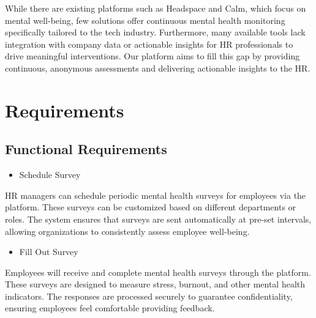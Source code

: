 \documentclass[conference]{IEEEtran}
\begin{document}
        While there are existing platforms such as Headspace and
        Calm, which focus on mental well-being, few solutions offer
        continuous mental health monitoring specifically tailored to
        the tech industry. Furthermore, many available tools lack
        integration with company data or actionable insights for HR
        professionals to drive meaningful interventions. Our platform
        aims to fill this gap by providing continuous, anonymous
        assessments and delivering actionable insights to the HR.
        \newline
    
    \section{Requirements}
        
        \subsection{Functional Requirements}
        
            \begin{itemize}
                \item Schedule Survey
            \end{itemize}
            
            HR managers can schedule periodic mental health surveys
            for employees via the platform. These surveys can be
            customized based on different departments or roles. The
            system ensures that surveys are sent automatically at pre-set
            intervals, allowing organizations to consistently assess
            employee well-being.
            \newline
            
            \begin{itemize}
                \item Fill Out Survey
            \end{itemize}
                
            Employees will receive and complete mental health
            surveys through the platform. These surveys are designed to
            measure stress, burnout, and other mental health indicators.
            The responses are processed securely to guarantee
            confidentiality, ensuring employees feel comfortable
            providing feedback.%
            \newline
            
\end{document}
